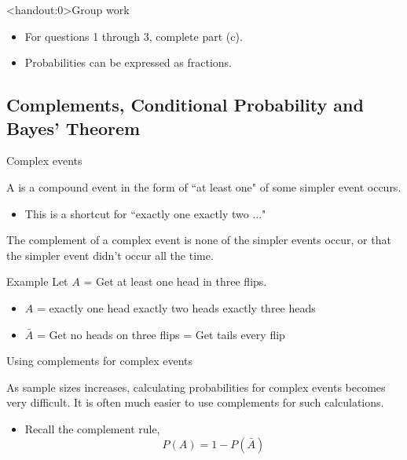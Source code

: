 \documentclass[xcolor=table, handout]{beamer}
\begin{document}
\begin{frame}<handout:0>{Group work}
\begin{block}{}
\large
\begin{itemize}
\item For questions 1 through 3, complete part (c).
\item Probabilities can be expressed as fractions.
\end{itemize}
\end{block}
\end{frame}

\subsection{Complements, Conditional Probability and Bayes' Theorem}

\begin{frame}{Complex events}

\begin{block}{}
{\large A  is a compound event in the form of ``at least one" of some simpler event occurs.}
\begin{itemize}
\pause
\item This is a shortcut for ``exactly one  exactly two ..."
\end{itemize}
\end{block}

\pause

\begin{block}{}
The complement of a complex event is none of the simpler events occur, or that the simpler event didn't occur all the time.
\end{block}

\begin{exampleblock}{Example}
Let $A$ = Get at least one head in three flips.
\begin{itemize}
\pause
\item $A$ = exactly one head  exactly two heads  exactly three heads
\pause
\item $\bar A$ = Get no heads on three flips = Get tails every flip
\end{itemize}
\end{exampleblock}
\end{frame}

\begin{frame}{Using complements for complex events}
\begin{block}{}
As sample sizes increases, calculating probabilities for complex events becomes very difficult. It is often much easier to use complements for such calculations.

\begin{itemize}
\item Recall the complement rule,
\[P(A) = 1 - P(\bar A)\]
\end{itemize}
\end{block}
\end{frame}
\end{document}
